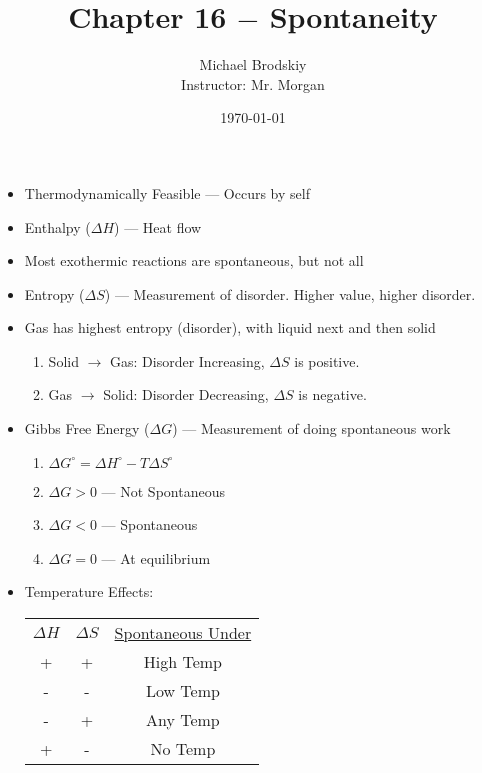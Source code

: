 \documentclass[12pt]{article}
\title{Chapter 16 $-$ Spontaneity}
\date{\today}
\author{Michael Brodskiy\\ \small Instructor: Mr. Morgan}
\begin{document}
\maketitle

\begin{itemize}

  \item Thermodynamically Feasible — Occurs by self

  \item Enthalpy ($\Delta H$) — Heat flow

  \item Most exothermic reactions are spontaneous, but not all

  \item Entropy ($\Delta S$) — Measurement of disorder. Higher value, higher disorder.

  \item Gas has highest entropy (disorder), with liquid next and then solid

    \begin{enumerate}

      \item Solid $\rightarrow$ Gas: Disorder Increasing, $\Delta S$ is positive.

      \item Gas $\rightarrow$ Solid: Disorder Decreasing, $\Delta S$ is negative.

    \end{enumerate}

  \item Gibbs Free Energy ($\Delta G$) — Measurement of doing spontaneous work

    \begin{enumerate}

      \item $\Delta G^{\circ}=\Delta H^{\circ} -T\Delta S^{\circ}$

      \item $\Delta G > 0$ — Not Spontaneous

      \item $\Delta G < 0$ — Spontaneous

      \item $\Delta G = 0$ — At equilibrium

    \end{enumerate}

  \item Temperature Effects:

    \begin{center}
      \begin{tabular}{c c c}
        \underline{$\Delta H$} & \underline{$\Delta S$} & \underline{Spontaneous Under}\\
        + & + & High Temp\\
        - & - & Low Temp\\
        - & + & Any Temp\\
        + & - & No Temp\\
      \end{tabular}
    \end{center}

\end{itemize}
\end{document}
